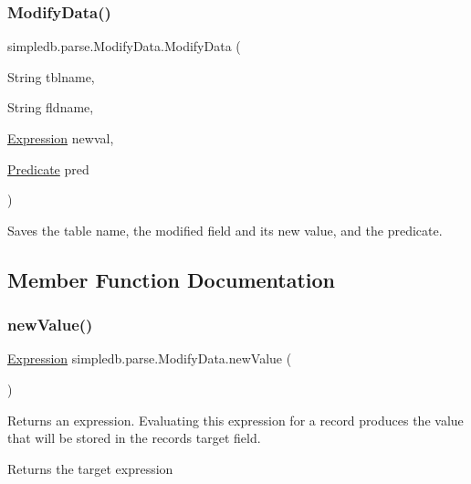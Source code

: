 \subsubsection{\texorpdfstring{Modify\+Data()}{ModifyData()}}
{\footnotesize\ttfamily simpledb.\+parse.\+Modify\+Data.\+Modify\+Data (\begin{DoxyParamCaption}\item[{String}]{tblname,  }\item[{String}]{fldname,  }\item[{\hyperlink{classsimpledb_1_1query_1_1Expression}{Expression}}]{newval,  }\item[{\hyperlink{classsimpledb_1_1query_1_1Predicate}{Predicate}}]{pred }\end{DoxyParamCaption})\hspace{0.3cm}{\ttfamily [inline]}}

Saves the table name, the modified field and its new value, and the predicate. 

\subsection{Member Function Documentation}
\mbox{\label{classsimpledb_1_1parse_1_1ModifyData_a4bbcd89228fdd081bdd5ec42f761c5eb}} 
\subsubsection{\texorpdfstring{new\+Value()}{newValue()}}
{\footnotesize\ttfamily \hyperlink{classsimpledb_1_1query_1_1Expression}{Expression} simpledb.\+parse.\+Modify\+Data.\+new\+Value (\begin{DoxyParamCaption}{ }\end{DoxyParamCaption})\hspace{0.3cm}{\ttfamily [inline]}}

Returns an expression. Evaluating this expression for a record produces the value that will be stored in the record\textquotesingle{}s target field. \begin{DoxyReturn}{Returns}
the target expression 
\end{DoxyReturn}
\mbox{\label{classsimpledb_1_1parse_1_1ModifyData_aa81f40c1844cc995612d93ce3b31de45}} 
